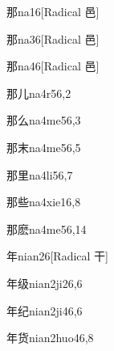 \begin{verbete}{那}{na1}{6}[Radical 邑]
\end{verbete}

\begin{verbete}{那}{na3}{6}[Radical 邑]
\end{verbete}

\begin{verbete}{那}{na4}{6}[Radical 邑]
\end{verbete}

\begin{verbete}{那儿}{na4r5}{6,2}
\end{verbete}

\begin{verbete}{那么}{na4me5}{6,3}
\end{verbete}

\begin{verbete}{那末}{na4me5}{6,5}
\end{verbete}

\begin{verbete}{那里}{na4li5}{6,7}
\end{verbete}

\begin{verbete}{那些}{na4xie1}{6,8}
\end{verbete}

\begin{verbete}{那麽}{na4me5}{6,14}
\end{verbete}

\begin{verbete}{年}{nian2}{6}[Radical 干]
\end{verbete}

\begin{verbete}{年级}{nian2ji2}{6,6}
\end{verbete}

\begin{verbete}{年纪}{nian2ji4}{6,6}
\end{verbete}

\begin{verbete}{年货}{nian2huo4}{6,8}
\end{verbete}


